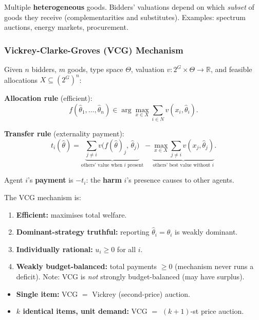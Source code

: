 \begin{defbox}
Multiple \textbf{heterogeneous} goods. Bidders' valuations depend on which \emph{subset} of goods they receive (complementarities and substitutes). Examples: spectrum auctions, energy markets, procurement.
\end{defbox}

\separator

\subsubsection{Vickrey-Clarke-Groves (VCG) Mechanism}

\begin{defbox}
Given $n$ bidders, $m$ goods, type space $\Theta$, valuation $v: 2^G \times \Theta \to \mathbb{R}$, and feasible allocations $X \subseteq (2^G)^n$:

\textbf{Allocation rule} (efficient):
\[
  f(\hat{\theta}_1, \ldots, \hat{\theta}_n) \in \arg\max_{x \in X} \sum_{i \in N} v(x_i, \hat{\theta}_i).
\]

\textbf{Transfer rule} (externality payment):
\[
  t_i(\hat{\theta}) = \underbrace{\sum_{j \neq i} v\bigl(f(\hat{\theta})_j,\, \hat{\theta}_j\bigr)}_{\text{others' value when } i \text{ present}} - \underbrace{\max_{x \in X} \sum_{j \neq i} v(x_j, \hat{\theta}_j)}_{\text{others' best value without } i}.
\]

Agent $i$'s \textbf{payment} is $-t_i$: the \textbf{harm} $i$'s presence causes to other agents.
\end{defbox}

\begin{thmbox}
The VCG mechanism is:
\begin{enumerate}
  \item \textbf{Efficient:} maximises total welfare.
  \item \textbf{Dominant-strategy truthful:} reporting $\hat{\theta}_i = \theta_i$ is weakly dominant.
  \item \textbf{Individually rational:} $u_i \geq 0$ for all $i$.
  \item \textbf{Weakly budget-balanced:} total payments $\geq 0$ (mechanism never runs a deficit). Note: VCG is \emph{not} strongly budget-balanced (may have surplus).
\end{enumerate}
\end{thmbox}

\begin{tipbox}
\begin{itemize}
  \item \textbf{Single item:} VCG $=$ Vickrey (second-price) auction.
  \item \textbf{$k$ identical items, unit demand:} VCG $=$ $(k+1)$-st price auction.
\end{itemize}
\end{tipbox}

